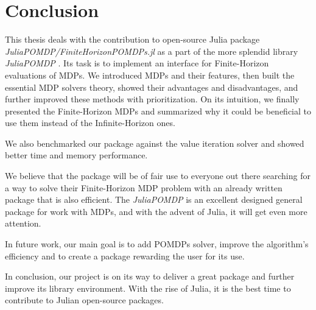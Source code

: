 
\chapter{Conclusion}

This thesis deals with the contribution to open-source Julia package \newline \textit{JuliaPOMDP/FiniteHorizonPOMDPs.jl} \cite{FHPOMDP} as a part of the more splendid library \textit{JuliaPOMDP} \cite{JuliaPOMDP}. Its task is to implement an interface for Finite-Horizon evaluations of MDPs. We introduced MDPs and their features, then built the essential MDP solvers theory, showed their advantages and disadvantages, and further improved these methods with prioritization. On its intuition, we finally presented the Finite-Horizon MDPs and summarized why it could be beneficial to use them instead of the Infinite-Horizon ones. 

We also benchmarked our package against the value iteration solver and showed better time and memory performance.


We believe that the package will be of fair use to everyone out there searching for a way to solve their Finite-Horizon MDP  problem with an already written package that is also efficient. The \textit{JuliaPOMDP} \cite{JuliaPOMDP} is an excellent designed general package for work with MDPs, and with the advent of Julia, it will get even more attention.

In future work, our main goal is to add POMDPs solver, improve the algorithm's efficiency and to create a package rewarding the user for its use.

In conclusion, our project is on its way to deliver a great package and further improve its library environment. With the rise of Julia, it is the best time to contribute to Julian open-source packages.